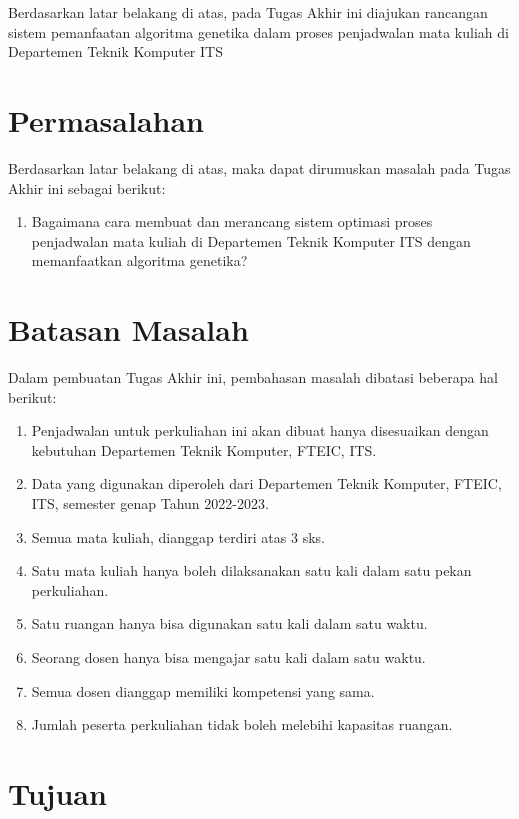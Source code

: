 Berdasarkan latar belakang di atas, pada Tugas Akhir ini diajukan rancangan sistem pemanfaatan algoritma genetika dalam proses penjadwalan mata kuliah di Departemen Teknik Komputer ITS
\section{Permasalahan}
\label{sec:permasalahan}

Berdasarkan latar belakang di atas, maka dapat dirumuskan masalah pada Tugas Akhir ini sebagai berikut:
\begin{enumerate}
    \item Bagaimana cara membuat dan merancang sistem optimasi proses penjadwalan mata kuliah di Departemen Teknik Komputer ITS dengan memanfaatkan algoritma genetika?
\end{enumerate}
\section{Batasan Masalah}
\label{sec:batasanmasalah}

Dalam pembuatan Tugas Akhir ini, pembahasan masalah dibatasi beberapa hal berikut:
\begin{enumerate}[nolistsep]
    \item Penjadwalan untuk perkuliahan ini akan dibuat hanya disesuaikan dengan kebutuhan Departemen Teknik Komputer, FTEIC, ITS.
    \item Data yang digunakan diperoleh dari Departemen Teknik Komputer, FTEIC, ITS, semester genap Tahun 2022-2023.
    \item Semua mata kuliah, dianggap terdiri atas 3 sks.
    \item Satu mata kuliah hanya boleh dilaksanakan satu kali dalam satu pekan perkuliahan.
    \item Satu ruangan hanya bisa digunakan satu kali dalam satu waktu.
    \item Seorang dosen hanya bisa mengajar satu kali dalam satu waktu.
    \item Semua dosen dianggap memiliki kompetensi yang sama.
    \item Jumlah peserta perkuliahan tidak boleh melebihi kapasitas ruangan.
\end{enumerate}

\section{Tujuan}
\label{sec:Tujuan}

